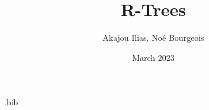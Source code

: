 \RequirePackage{filecontents}

\begin{filecontents}{\jobname.bib}
\end{filecontents}

\documentclass{article}
\usepackage[utf8]{inputenc}
\usepackage[T1]{fontenc}
\usepackage[french]{babel}
\usepackage[parfill]{parskip}
\usepackage{amsmath}
\usepackage{amssymb}
\usepackage{amsfonts}
\usepackage{subfigure}
\usepackage[font={small}]{caption}
\usepackage{float}
\usepackage{listingsutf8}
\usepackage{fullpage}
\usepackage[nochapter]{vhistory}
\usepackage{hyperref}
\usepackage{titlesec}
\usepackage{xcolor}
\usepackage{verbatim}
\usepackage{graphicx}
\usepackage{subcaption}
\usepackage{comment}

\usepackage{natbib}
\usepackage{url}
\usepackage{algpseudocode}

\usepackage{adjustbox}



\newcommand*{\MyIncludeGraphicsMaxSize}[2][]{%
    \begin{adjustbox}{max size={\textwidth}{\textheight}}
        \texttt{[image: \#2]}%
    \end{adjustbox}
}
\usepackage{array,booktabs,ragged2e}
\usepackage{lstdoc}
\newcolumntype{R}[1]{>{\RaggedLeft\arraybackslash}p{#1}}
\newcolumntype{D}[1]{>{\RaggedLeft\arraybackslash}p{#1}}


\hypersetup{
    colorlinks=true,
    linkcolor=blue,
    filecolor=magenta,
    urlcolor=cyan,
    pdfpagemode=FullScreen,
}


\title{R-Trees}
\author{Akajou Ilias, Noé Bourgeois }
\date{March 2023}



    \maketitle
    \tableofcontents
    \newpage

    \section{R-Trees}
    \subsection{Contexte}
    Ce projet consiste en

